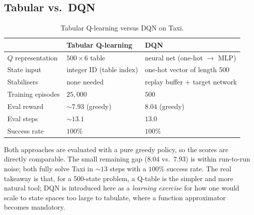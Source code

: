 \documentclass[11pt]{article}
\begin{document}
\subsection{Tabular vs.\ DQN}
\begin{table}[h]
\centering
\begin{tabular}{@{}lll@{}}
\toprule
 & \textbf{Tabular Q-learning} & \textbf{DQN} \\
\midrule
$Q$ representation & $500 \times 6$ table        & neural net (one-hot $\rightarrow$ MLP) \\
State input        & integer ID (table index)    & one-hot vector of length $500$ \\
Stabilisers        & none needed                 & replay buffer $+$ target network \\
Training episodes  & $25{,}000$                  & $500$ \\
Eval reward        & $\sim 7.93$ (greedy)        & $8.04$ (greedy) \\
Eval steps         & $\sim 13.1$                 & $13.0$ \\
Success rate       & $100\%$                     & $100\%$ \\
\bottomrule
\end{tabular}
\caption{Tabular Q-learning versus DQN on Taxi.}
\label{tab:tabvsdqn}
\end{table}

\noindent Both approaches are evaluated with a pure greedy policy, so the scores are directly
comparable. The small remaining gap ($8.04$ vs.\ $7.93$) is within run-to-run noise; both
fully solve Taxi in $\sim$$13$ steps with a $100\%$ success rate. The real takeaway is that,
for a 500-state problem, a Q-table is the simpler and more natural tool; DQN is introduced
here as a \emph{learning exercise} for how one would scale to state spaces too large to
tabulate, where a function approximator becomes mandatory.

\end{document}
